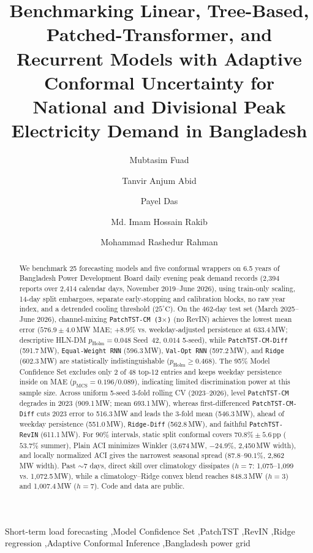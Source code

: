 \documentclass[5p,twocolumn,authoryear]{elsarticle}
\begin{document}
\begin{frontmatter}

\title{Benchmarking Linear, Tree-Based, Patched-Transformer, and Recurrent Models with Adaptive Conformal Uncertainty for National and Divisional Peak Electricity Demand in Bangladesh}

\author[nsu]{Mubtasim Fuad}
\author[nsu]{Tanvir Anjum Abid}
\author[nsu]{Payel Das}
\author[nsu]{Md. Imam Hossain Rakib}
\author[nsu]{Mohammad Rashedur Rahman}

\address[nsu]{Department of Electrical and Computer Engineering, North South University, Bashundhara, Dhaka 1229, Bangladesh}

\begin{abstract}
We benchmark 25 forecasting models and five conformal wrappers on 6.5 years of Bangladesh Power Development Board daily evening peak demand records (2,394 reports over 2,414 calendar days, November 2019--June 2026), using train-only scaling, 14-day split embargoes, separate early-stopping and calibration blocks, no raw year index, and a detrended cooling threshold ($25^\circ\text{C}$). On the 462-day test set (March 2025--June 2026), channel-mixing \texttt{PatchTST-CM (3$\times$)} (no RevIN) achieves the lowest mean error ($576.9 \pm 4.0$\,MW MAE; $+8.9\%$ vs. weekday-adjusted persistence at 633.4\,MW; descriptive HLN-DM $p_{\text{Holm}} = 0.048$ Seed~42, $0.014$ 5-seed), while \texttt{PatchTST-CM-Diff} (591.7\,MW), \texttt{Equal-Weight RNN} (596.3\,MW), \texttt{Val-Opt RNN} (597.2\,MW), and \texttt{Ridge} (602.3\,MW) are statistically indistinguishable ($p_{\text{Holm}} \ge 0.468$). The 95\% Model Confidence Set excludes only 2 of 48 top-12 entries and keeps weekday persistence inside on MAE ($p_{\text{MCS}} = 0.196 / 0.089$), indicating limited discrimination power at this sample size. Across uniform 5-seed 3-fold rolling CV (2023--2026), level \texttt{PatchTST-CM} degrades in 2023 (909.1\,MW; mean 693.1\,MW), whereas first-differenced \texttt{PatchTST-CM-Diff} cuts 2023 error to 516.3\,MW and leads the 3-fold mean (546.3\,MW), ahead of weekday persistence (551.0\,MW), \texttt{Ridge-Diff} (562.8\,MW), and faithful \texttt{PatchTST-RevIN} (611.1\,MW). For 90\% intervals, static split conformal covers $70.8\% \pm 5.6$\,pp ($53.7\%$ summer), Plain ACI minimizes Winkler (3,674\,MW, $-24.9\%$, 2,450\,MW width), and locally normalized ACI gives the narrowest seasonal spread ($87.8$--$90.1\%$, 2,862\,MW width). Past $\sim$7 days, direct skill over climatology dissipates ($h=7$: 1,075--1,099 vs. 1,072.5\,MW), while a climatology--Ridge convex blend reaches 848.3\,MW ($h=3$) and 1,007.4\,MW ($h=7$). Code and data are public.
\end{abstract}

\begin{keyword}
Short-term load forecasting \sep Model Confidence Set \sep PatchTST \sep RevIN \sep Ridge regression \sep Adaptive Conformal Inference \sep Bangladesh power grid
\end{keyword}

\end{frontmatter}
\end{document}

